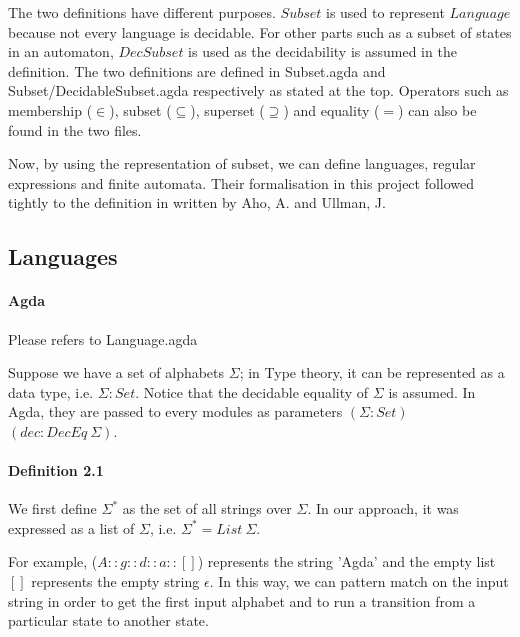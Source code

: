 \documentclass[twoside,openright,final]{bhamthesis}
\begin{document}
\par The two definitions have different purposes. \(Subset\) is used to represent \(Language\) because not every
language is decidable. For other parts 
such as a subset of states in an automaton, \(DecSubset\) is used
as the decidability is assumed in the definition. The two definitions
are defined in Subset.agda and Subset/DecidableSubset.agda
respectively as stated at the top. Operators such as membership (\(\in\)), subset
(\(\subseteq\)), superset (\(\supseteq\)) and equality (\(=\)) can
also be found in the two files. 

\par Now, by using the representation of subset, we can define languages, regular expressions and finite
automata. Their formalisation in this project followed tightly to the
definition in \cite{aho1972} written by Aho, A. and Ullman, J. 

\subsection{Languages}
\paragraph{Agda} Please refers to Language.agda \\

\par Suppose we have a set of alphabets \(\Sigma\); in Type theory, it
can be represented as a data type, i.e. \(\Sigma : Set\). Notice that the decidable equality of
\(\Sigma\) is assumed. In Agda, they are passed to every modules as
parameters \((\Sigma : Set)\) \((dec : DecEq\ \Sigma)\). 

\paragraph{Definition 2.1} We first define \(\Sigma^*\) as the set of all
strings over \(\Sigma\). In our approach, it was expressed as a list of
\(\Sigma\), i.e. \(\Sigma^* = List\ \Sigma\). \\ 

\par For example, (\(A :: g ::
d :: a :: []\)) represents the string 'Agda' and the empty list \([]\)
represents the empty string \(\epsilon\). In this way, we can pattern
match on the input string in order to get the first
input alphabet and to run a transition from a particular state to another state. 
\end{document}
